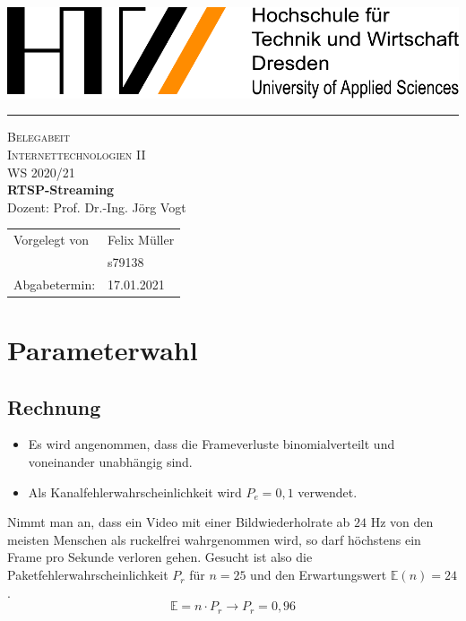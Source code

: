 \documentclass[12pt,a4paper]{article}
\begin{document}
\thispagestyle{empty}
\vspace*{-3cm}
\begin{center}
\includegraphics[width=\textwidth]{htw.pdf}
\vspace{0.5cm}
\hrule
\vspace{5.5cm}
{\Large \textsc{Belegabeit\\
Internettechnologien II}}\\
{\large WS 2020/21}\\
\vspace{1cm}
{\Large \bf
RTSP-Streaming}\\
\vspace*{1cm}
{\large Dozent:  Prof. Dr.-Ing. Jörg Vogt}
\end{center}
\vspace*{5cm}
{\large

\hspace*{7cm}
\parbox{8.2cm}
{
\begin{tabular}{ll}
Vorgelegt von & Felix Müller\\
& s79138\\
Abgabetermin: & 17.01.2021

\end{tabular}}}

\newpage
{}
\tableofcontents

\newpage
\section{Parameterwahl}\label{intro}

\subsection{Rechnung}

\begin{itemize}
	\item Es wird angenommen, dass die Frameverluste binomialverteilt und voneinander unabhängig sind.
	\item Als Kanalfehlerwahrscheinlichkeit wird $P_e = 0,1$ verwendet.
\end{itemize}

Nimmt man an, dass ein Video mit einer Bildwiederholrate ab $24 \textrm{ Hz}$ von den meisten Menschen als ruckelfrei wahrgenommen wird, so darf höchstens ein Frame pro Sekunde verloren gehen. Gesucht ist also die Paketfehlerwahrscheinlichkeit $P_r$ für $n = 25$ und den Erwartungswert $\mathbb{E}(n) = 24$.
$$\mathbb{E} = n \cdot P_r \rightarrow P_r = 0,96$$
\end{document}
